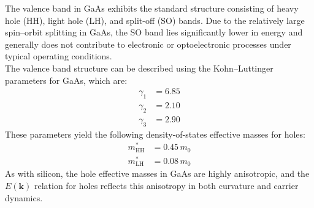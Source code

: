 The valence band in GaAs exhibits the standard structure consisting of heavy hole (HH), light hole (LH), and split-off (SO) bands. Due to the relatively large spin–orbit splitting in GaAs, the SO band lies significantly lower in energy and generally does not contribute to electronic or optoelectronic processes under typical operating conditions.\\
The valence band structure can be described using the Kohn–Luttinger parameters for GaAs, which are:
\begin{align*}
\gamma_1 &= 6.85 \\
\gamma_2 &= 2.10 \\
\gamma_3 &= 2.90
\end{align*}
These parameters yield the following density-of-states effective masses for holes:
\begin{align*}
m^*_{\text{HH}} &= 0.45\, m_0 \\
m^*_{\text{LH}} &= 0.08\, m_0
\end{align*}
As with silicon, the hole effective masses in GaAs are highly anisotropic, and the \( E(\mathbf{k}) \) relation for holes reflects this anisotropy in both curvature and carrier dynamics.

